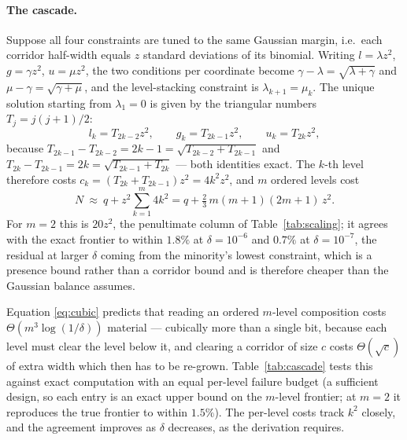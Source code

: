 \documentclass[11pt]{article}
\theoremstyle{plain}
\theoremstyle{definition}
\theoremstyle{remark}
\begin{document}
\paragraph{The cascade.} Suppose all four constraints are tuned to the same
Gaussian margin, i.e.\ each corridor half-width equals $z$ standard deviations
of its binomial. Writing $l=\lambda z^{2}$, $g=\gamma z^{2}$, $u=\mu z^{2}$,
the two conditions per coordinate become
$\gamma-\lambda=\sqrt{\lambda+\gamma}$ and $\mu-\gamma=\sqrt{\gamma+\mu}$, and
the level-stacking constraint is $\lambda_{k+1}=\mu_k$. The unique solution
starting from $\lambda_1=0$ is given by the triangular numbers
$T_j=j(j+1)/2$:
\begin{equation}\label{eq:cascade}
l_k=T_{2k-2}z^{2},\qquad g_k=T_{2k-1}z^{2},\qquad u_k=T_{2k}z^{2},
\end{equation}
because $T_{2k-1}-T_{2k-2}=2k-1=\sqrt{T_{2k-2}+T_{2k-1}}$ and
$T_{2k}-T_{2k-1}=2k=\sqrt{T_{2k-1}+T_{2k}}$ --- both identities exact. The
$k$-th level therefore costs $c_k=(T_{2k}+T_{2k-1})z^{2}=4k^{2}z^{2}$, and $m$
ordered levels cost
\begin{equation}\label{eq:cubic}
N\ \approx\ q+z^{2}\sum_{k=1}^{m}4k^{2}
=q+\tfrac23\,m(m+1)(2m+1)\,z^{2}.
\end{equation}
For $m=2$ this is $20z^{2}$, the penultimate column of
Table~\ref{tab:scaling}; it agrees with the exact frontier to within $1.8\%$
at $\delta=10^{-6}$ and $0.7\%$ at $\delta=10^{-7}$, the residual at larger
$\delta$ coming from the minority's lowest constraint, which is a presence
bound rather than a corridor bound and is therefore cheaper than the Gaussian
balance assumes.

Equation \eqref{eq:cubic} predicts that reading an ordered $m$-level
composition costs $\Theta(m^{3}\log(1/\delta))$ material --- cubically more
than a single bit, because each level must clear the level below it,
and clearing a corridor of size $c$ costs $\Theta(\sqrt{c})$ of extra width
which then has to be re-grown. Table~\ref{tab:cascade} tests this against
exact computation with an equal per-level failure budget (a sufficient design,
so each entry is an exact upper bound on the $m$-level frontier; at $m=2$ it
reproduces the true frontier to within $1.5\%$). The per-level costs track
$k^{2}$ closely, and the agreement improves as $\delta$ decreases, as the
derivation requires.
\end{document}
